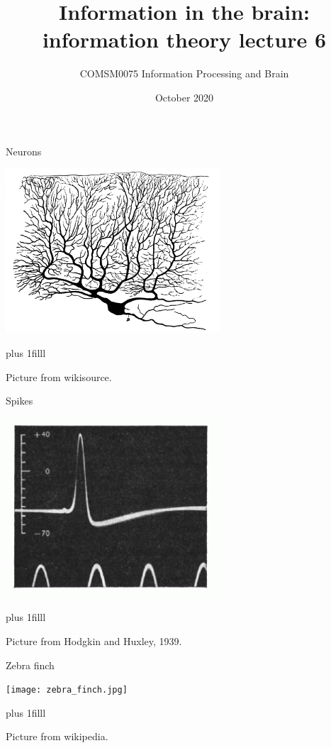 \documentclass{beamer}
\title[Information Theory lecture 6]{Information in the brain: information theory lecture 6}
\author{COMSM0075 Information Processing and Brain}
\institute{\texttt{comsm0075.github.io}}
\date{October 2020}
\newcommand{\btVFill}{\vskip0pt plus 1filll}
\begin{document}
\maketitle


\begin{frame}{Neurons}
\color{reddish}
\begin{center}
\includegraphics[width=8cm]{PC.png}
\end{center}
\btVFill
\begin{flushright}
\tiny{Picture from wikisource.}
\end{flushright}
\end{frame}

\begin{frame}{Spikes}
\color{reddish}
\begin{center}
\includegraphics[width=8cm]{spike.png}
\end{center}
\btVFill
\begin{flushright}
\tiny{Picture from Hodgkin and Huxley, 1939.}
\end{flushright}
\end{frame}


\begin{frame}{Zebra finch}
\color{reddish}
\begin{center}
\texttt{[image: zebra\_finch.jpg]}
\end{center}
\btVFill
\begin{flushright}
\tiny{Picture from wikipedia.}
\end{flushright}
\end{frame}
\end{document}
